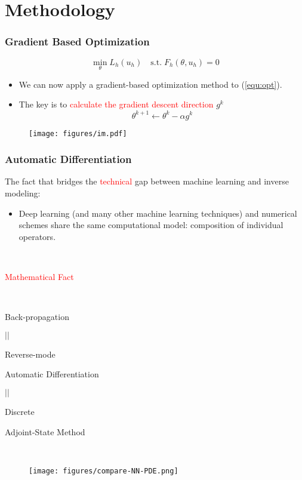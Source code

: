 \documentclass[usenames,dvipsnames]{beamer}
\begin{document}
\section{Methodology}


\begin{frame}
	\frametitle{Gradient Based Optimization}
	\begin{equation}\label{equ:opt}
		\min_{\theta} L_h(u_h) \quad \mathrm{s.t.}\; F_h(\theta, u_h) = 0
		\end{equation}
	
	\begin{itemize}
		\item We can now apply a gradient-based optimization method to (\ref{equ:opt}).
		\item The key is to \textcolor{red}{calculate the gradient descent direction} $g^k$
		$$\theta^{k+1} \gets \theta^k - \alpha g^k$$ 
	\end{itemize}
	
	\begin{figure}[hbt]
	\centering
  \texttt{[image: figures/im.pdf]}
\end{figure}

\end{frame}




\begin{frame}
	\frametitle{Automatic Differentiation}
The fact that bridges the \textcolor{red}{technical} gap between machine learning and inverse modeling:
	\begin{itemize}
		\item Deep learning (and many other machine learning techniques) and numerical schemes share the same computational model: composition of individual operators. 
	\end{itemize}
	

\begin{minipage}[t]{0.4\textwidth}

\



\begin{center}
			\textcolor{red}{Mathematical Fact}

			\
			
	Back-propagation 

$||$

Reverse-mode

 Automatic Differentiation 

$||$
 
 Discrete 
 
 Adjoint-State Method
\end{center}
\end{minipage}~
\begin{minipage}[t]{0.6\textwidth}
\begin{figure}[hbt]
  \texttt{[image: figures/compare-NN-PDE.png]}
\end{figure}
\end{minipage}

\end{frame}
\end{document}
